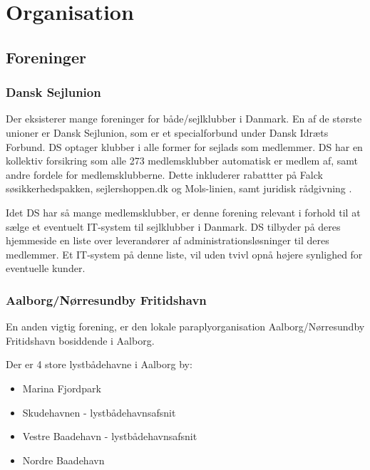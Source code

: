 \section{Organisation}

\subsection{Foreninger} %
\label{sub:Foreninger}

\subsubsection{Dansk Sejlunion} %
\label{ssub:Dansk Sejlunion}

Der eksisterer mange foreninger for både/sejlklubber i Danmark. En af de største unioner er Dansk Sejlunion, som er et specialforbund under Dansk Idræts Forbund. DS optager klubber i alle former for sejlads som medlemmer. DS har en kollektiv forsikring som alle 273 medlemsklubber automatisk er medlem af, samt andre fordele for medlemsklubberne. Dette inkluderer rabattter på Falck søsikkerhedspakken, sejlershoppen.dk og Mols-linien, samt juridisk rådgivning \cite{ds_optagelse,ds_fordele}.

Idet DS har så mange medlemsklubber, er denne forening relevant i forhold til at sælge et eventuelt IT-system til sejlklubber i Danmark. DS tilbyder på deres hjemmeside en liste over leverandører af administrationsløsninger til deres medlemmer. Et IT-system på denne liste, vil uden tvivl opnå højere synlighed for eventuelle kunder.


\subsubsection{Aalborg/Nørresundby Fritidshavn}

En anden vigtig forening, er den lokale paraplyorganisation Aalborg/Nørresundby Fritidshavn bosiddende i Aalborg.


Der er 4 store lystbådehavne i Aalborg by:
\begin{itemize}[noitemsep]
    \item Marina Fjordpark
    \item Skudehavnen - lystbådehavnsafsnit
    \item Vestre Baadehavn - lystbådehavnsafsnit
    \item Nordre Baadehavn
\end{itemize}

